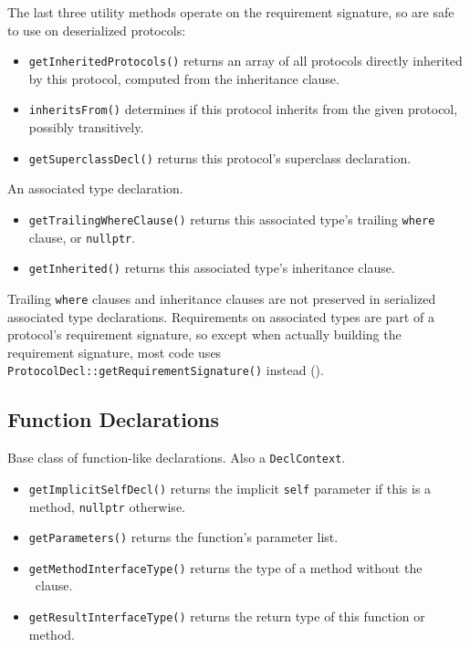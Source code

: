 \documentclass[../generics]{subfiles}
\begin{document}
The last three utility methods operate on the requirement signature, so are safe to use on deserialized protocols:
\begin{itemize}
\item \texttt{getInheritedProtocols()} returns an array of all protocols directly inherited by this protocol, computed from the inheritance clause.
\item \texttt{inheritsFrom()} determines if this protocol inherits from the given protocol, possibly transitively.
\item \texttt{getSuperclassDecl()} returns this protocol's superclass declaration.
\end{itemize}

An associated type declaration.
\begin{itemize}
\item \texttt{getTrailingWhereClause()} returns this associated type's trailing \texttt{where} clause, or \texttt{nullptr}.
\item \texttt{getInherited()} returns this associated type's inheritance clause.
\end{itemize}

Trailing \texttt{where} clauses and inheritance clauses are not preserved in serialized associated type declarations. Requirements on associated types are part of a protocol's requirement signature, so except when actually building the requirement signature, most code uses \texttt{ProtocolDecl::getRequirementSignature()} instead ().

\subsection*{Function Declarations}

Base class of function-like declarations. Also a \texttt{DeclContext}.
\begin{itemize}
\item \texttt{getImplicitSelfDecl()} returns the implicit \texttt{self} parameter if this is a method, \texttt{nullptr} otherwise.
\item \texttt{getParameters()} returns the function's parameter list.
\item \texttt{getMethodInterfaceType()} returns the type of a method without the \tSelf\ clause.
\item \texttt{getResultInterfaceType()} returns the return type of this function or method.
\end{itemize}
\end{document}
